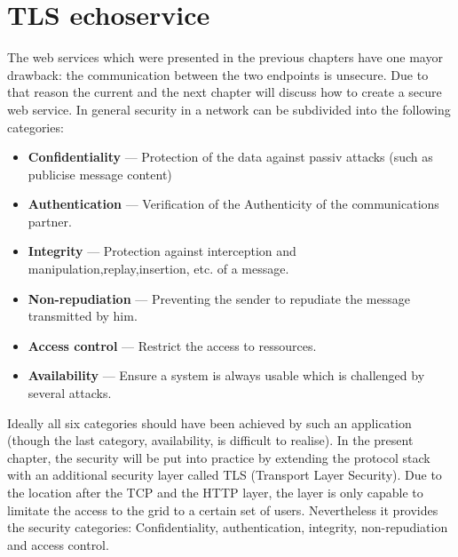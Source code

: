 \chapter{TLS echoservice}

The web services which were presented in the previous chapters have one mayor drawback: the communication between the two endpoints is unsecure.
Due to that reason the current and the next chapter will discuss how to create a secure web service.
In general security in a network can be subdivided into the following categories:~\cite{TANNENBAUM_2001}
\begin{itemize}
	\item \textbf{Confidentiality} --- Protection of the data against passiv attacks (such as publicise message content)
	
	\item \textbf{Authentication} --- Verification of the Authenticity  of the communications partner.

	\item \textbf{Integrity} --- Protection against interception and manipulation,replay,insertion, etc.  of a message.

	\item \textbf{Non-repudiation} --- Preventing the sender to repudiate the message transmitted by him.

	\item \textbf{Access control} --- Restrict the access to ressources.

	\item \textbf{Availability} --- Ensure a system is always usable which is challenged by several attacks.

\end{itemize}
%
Ideally all six categories should have been achieved by such an application (though the last category, availability, is difficult to realise).
In the present chapter, the security will be put into practice by extending the protocol stack with an additional security layer called TLS (Transport Layer Security). Due to the location after the TCP and the HTTP layer, the layer is only capable to limitate the access to the grid to a certain set of users.
Nevertheless it provides the security categories: Confidentiality, authentication, integrity, non-repudiation and access control.\\


